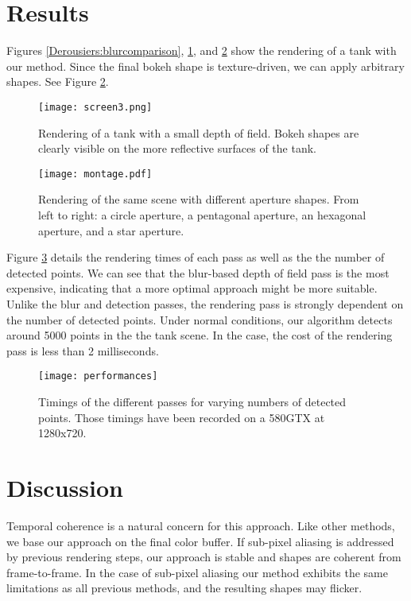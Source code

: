 \section{Results}
Figures \ref{Derousiers:blurcomparison}, \ref{Derousiers:bokehrendering}, and \ref{Derousiers:bokehcomparison} show the rendering of a tank with our method. Since the final bokeh shape is texture-driven, we can apply arbitrary shapes. See Figure \ref{Derousiers:bokehcomparison}.

	\begin{figure}[htb]\centering
	\texttt{[image: screen3.png]}
	\caption{Rendering of a tank with a small depth of field. Bokeh shapes are clearly visible on the more reflective surfaces of the tank.}
	\label{Derousiers:bokehrendering}
	\end{figure}

	\begin{figure}[htb]\centering
	\texttt{[image: montage.pdf]}
	\caption{Rendering of the same scene with different aperture shapes. From left to right: a circle aperture, a pentagonal aperture, an hexagonal aperture, and a star aperture.}
	\label{Derousiers:bokehcomparison}
	\end{figure}

Figure \ref{Derousiers:performance} details the rendering times of each pass as well as the the number of detected \bokeh points. We can see that the blur-based depth of field pass is the most expensive, indicating that a more optimal approach might be more suitable. Unlike the blur and detection passes, the rendering pass is strongly dependent on the number of detected \bokeh points. Under normal conditions, our algorithm detects around 5000 \bokeh points in the the tank scene. In the case, the cost of the rendering pass is less than 2 milliseconds.

	\begin{figure}[htb]\centering
	\texttt{[image: performances]}
	\caption{Timings of the different passes for varying numbers of detected \bokeh points. Those timings have been recorded on a 580GTX at 1280x720. }
	\label{Derousiers:performance}
	\end{figure}

\section{Discussion}
Temporal coherence is a natural concern for this approach. Like other methods, we base our approach on the final color buffer. If sub-pixel aliasing is addressed by previous rendering steps, our approach is stable and \bokeh shapes are coherent from frame-to-frame. In the case of sub-pixel aliasing our method exhibits the same limitations as all previous methods, and the resulting \bokeh shapes may flicker.

